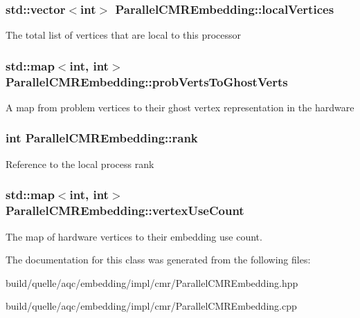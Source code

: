 \subsubsection[{\texorpdfstring{local\+Vertices}{localVertices}}]{\setlength{\rightskip}{0pt plus 5cm}std\+::vector$<$int$>$ Parallel\+C\+M\+R\+Embedding\+::local\+Vertices\hspace{0.3cm}{\ttfamily [protected]}}\hypertarget{a00092_a7f81e1e5a286768177b71c8dffa7e9f6}{}\label{a00092_a7f81e1e5a286768177b71c8dffa7e9f6}
The total list of vertices that are local to this processor 
\subsubsection[{\texorpdfstring{prob\+Verts\+To\+Ghost\+Verts}{probVertsToGhostVerts}}]{\setlength{\rightskip}{0pt plus 5cm}std\+::map$<$int, int$>$ Parallel\+C\+M\+R\+Embedding\+::prob\+Verts\+To\+Ghost\+Verts\hspace{0.3cm}{\ttfamily [protected]}}\hypertarget{a00092_af3c4dd74e7391233b124c1836295c6da}{}\label{a00092_af3c4dd74e7391233b124c1836295c6da}
A map from problem vertices to their ghost vertex representation in the hardware 
\subsubsection[{\texorpdfstring{rank}{rank}}]{\setlength{\rightskip}{0pt plus 5cm}int Parallel\+C\+M\+R\+Embedding\+::rank\hspace{0.3cm}{\ttfamily [protected]}}\hypertarget{a00092_a9d7285ee6c360563991d258977e9e1e9}{}\label{a00092_a9d7285ee6c360563991d258977e9e1e9}
Reference to the local process rank 
\subsubsection[{\texorpdfstring{vertex\+Use\+Count}{vertexUseCount}}]{\setlength{\rightskip}{0pt plus 5cm}std\+::map$<$int, int$>$ Parallel\+C\+M\+R\+Embedding\+::vertex\+Use\+Count\hspace{0.3cm}{\ttfamily [protected]}}\hypertarget{a00092_a7ab60092ad202fbd2af3ed738e2a440b}{}\label{a00092_a7ab60092ad202fbd2af3ed738e2a440b}
The map of hardware vertices to their embedding use count. 

The documentation for this class was generated from the following files\+:\begin{DoxyCompactItemize}
\item 
build/quelle/aqc/embedding/impl/cmr/\+Parallel\+C\+M\+R\+Embedding.\+hpp\item 
build/quelle/aqc/embedding/impl/cmr/\+Parallel\+C\+M\+R\+Embedding.\+cpp\end{DoxyCompactItemize}
